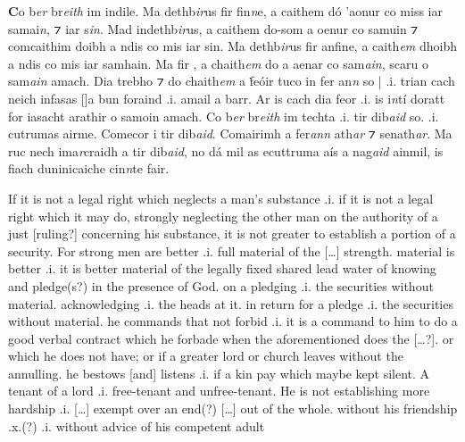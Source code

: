 \documentclass[11pt]{article}
\begin{document}
\begin{pages}
\begin{Leftside}
    \pstart
    \textbf{C}o b\emph{er} br\emph{eith} im indile. Ma dethb\emph{ir}us fir fin\emph{n}e, a caithem d\'{o} 'aonur co miss iar samai\emph{n}, ⁊  iar s\emph{in}.  Mad indethb\emph{ir}us, a caithem do-som a oenur co samuin ⁊ comcaithim doibh a ndis co mis iar sin.  Ma dethb\emph{ir}us fir anfine, a caith\emph{em} dhoibh a ndis co mis iar samhain.  Ma  fir , a chaith\emph{em} do a aenar co sam\emph{ain}, scaru o sam\emph{ain} amach.  Dia trebho ⁊ do chaith\emph{em} a \.{f}e\'{o}ir tuco in fer an\emph{n} so | .i. trian cach neich infasas [\hspace{2mm}]a bun foraind .i. amail a barr.  Ar is cach dia feor .i. is i\emph{n}t\'{i} doratt for iasacht  arathir o samoin amach.  Co b\emph{er} br\emph{eith} im techta .i. tir dib\emph{aid} so.   .i. cutrumas airme.  Comecor i tir dib\emph{aid}.  Comairimh a fer\emph{ann} ath\emph{ar} ⁊ senath\emph{ar}.  Ma ruc nech ima\emph{r}craidh a tir dib\emph{aid}, no d\'{a} mil as ecuttruma a\'{i}s a nag\emph{aid} ainmil, is fiach duninicaiche cin\emph{n}te fair.
    \pend
  \endnumbering
  \end{Leftside}

\begin{Rightside}
    \beginnumbering
    \pstart
    If it is not a legal right which neglects a man's substance .i. if it is not a legal right which it may do, strongly neglecting the other man on the authority of a just [ruling?] concerning his substance, it is not greater to establish a portion of a security.  For strong men are better .i. full material of the [\ldots] strength. material is better .i. it is better material of the legally fixed shared lead water of knowing and pledge(s?) in the presence of God.  on a pledging .i. the securities without material. acknowledging .i. the heads at it.  in return for a pledge .i. the securities without material.  he commands that not forbid .i. it is a command to him to do a good verbal contract which he forbade when the aforementioned does the [\ldots?].  or which he does not have; or if a greater lord or church leaves without the annulling.  he bestows [and] listens .i. if a kin pay which maybe kept silent.  A tenant of a lord .i. free-tenant and unfree-tenant. He is not establishing more hardship .i. [\ldots] exempt over an end(?) [\ldots] out of the whole.  without his friendship .x.(?) .i. without advice of his competent adult 
    \pend
    

\end{Rightside}
\end{pages}
\end{document}
